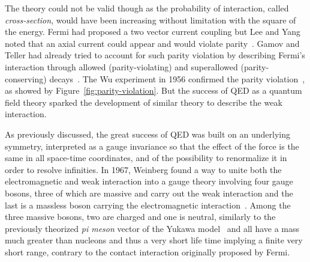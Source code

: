 	The theory could not be valid though as the probability of interaction, called \textit{cross-section}, would have been increasing without limitation with the square of the energy. Fermi had proposed a two vector current coupling but Lee and Yang noted that an axial current could appear and would violate parity~\cite{LEE1956}. Gamov and Teller had already tried to account for such parity violation by describing Fermi's interaction through allowed (parity-violating) and superallowed (parity-conserving) decays~\cite{GAMOW1936}. The Wu experiment in 1956 confirmed the parity violation~\cite{WU1957}, as showed by Figure~\ref{fig:parity-violation}. But the success of QED as a quantum field theory sparked the development of similar theory to describe the weak interaction.
	
	As previously discussed, the great success of QED was built on an underlying symmetry, interpreted as a gauge invariance so that the effect of the force is the same in all space-time coordinates, and of the possibility to renormalize it in order to resolve infinities. In 1967, Weinberg found a way to unite both the electromagnetic and weak interaction into a gauge theory involving four gauge bosons, three of which are massive and carry out the weak interaction and the last is a massless boson carrying the electromagnetic interaction~\cite{WEINBERG1967}. Among the three massive bosons, two are charged and one is neutral, similarly to the previously theorized \textit{pi meson} vector of the Yukawa model~\cite{YUKAWA1935} and all have a mass much greater than nucleons and thus a very short life time implying a finite very short range, contrary to the contact interaction originally proposed by Fermi.
	
